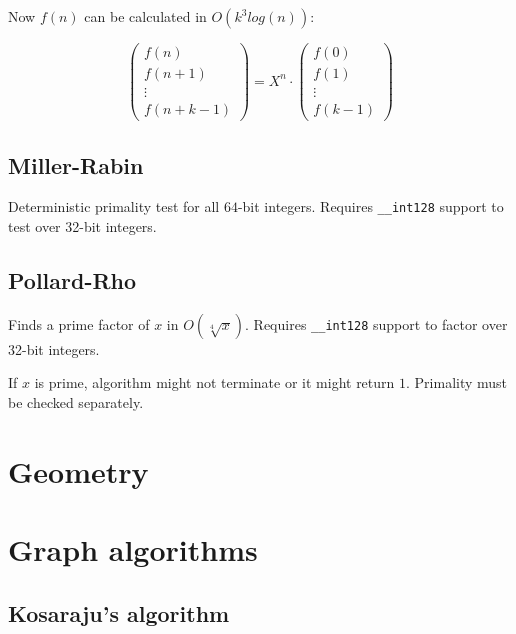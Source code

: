 \documentclass{article}
\begin{document}
Now $f(n)$ can be calculated in $O(k^3 log(n))$:

\[
	\begin{pmatrix}
		f(n) \\
		f(n+1) \\
		\vdots \\
		f(n+k-1)
	\end{pmatrix}
	= X^n \cdot
	\begin{pmatrix}
		f(0) \\
		f(1) \\
		\vdots \\
		f(k-1)
	\end{pmatrix}
\]



\subsection {Miller-Rabin}

Deterministic primality test for all $64$-bit integers. Requires \verb|__int128| support to test over 32-bit integers.



\subsection {Pollard-Rho}

Finds a prime factor of $x$ in $O(\sqrt[4]{x})$. Requires \verb|__int128| support to factor over 32-bit integers.

If $x$ is prime, algorithm might not terminate or it might return $1$. Primality must be checked separately.



\section {Geometry}



\section {Graph algorithms}

\subsection {Kosaraju's algorithm}
\end{document}
